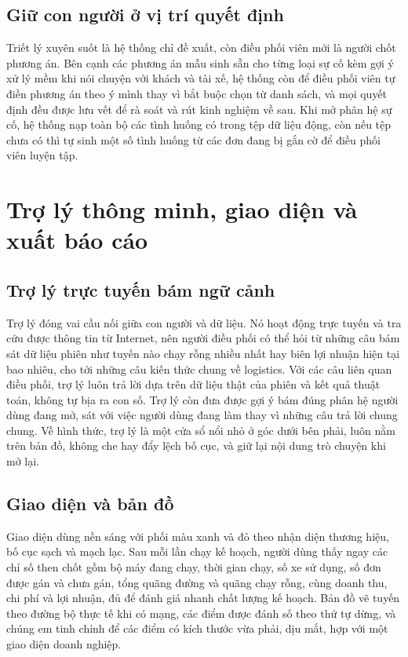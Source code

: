 \documentclass[12pt,a4paper,oneside]{report}
\begin{document}
\section{Giữ con người ở vị trí quyết định}
Triết lý xuyên suốt là hệ thống chỉ đề xuất, còn điều phối viên mới là người chốt phương án. Bên cạnh các phương án mẫu sinh sẵn cho từng loại sự cố kèm gợi ý xử lý mềm khi nói chuyện với khách và tài xế, hệ thống còn để điều phối viên tự điền phương án theo ý mình thay vì bắt buộc chọn từ danh sách, và mọi quyết định đều được lưu vết để rà soát và rút kinh nghiệm về sau. Khi mở phân hệ sự cố, hệ thống nạp toàn bộ các tình huống có trong tệp dữ liệu động, còn nếu tệp chưa có thì tự sinh một số tình huống từ các đơn đang bị gắn cờ để điều phối viên luyện tập.

\chapter{Trợ lý thông minh, giao diện và xuất báo cáo}

\section{Trợ lý trực tuyến bám ngữ cảnh}
Trợ lý đóng vai cầu nối giữa con người và dữ liệu. Nó hoạt động trực tuyến và tra cứu được thông tin từ Internet, nên người điều phối có thể hỏi từ những câu bám sát dữ liệu phiên như tuyến nào chạy rỗng nhiều nhất hay biên lợi nhuận hiện tại bao nhiêu, cho tới những câu kiến thức chung về logistics. Với các câu liên quan điều phối, trợ lý luôn trả lời dựa trên dữ liệu thật của phiên và kết quả thuật toán, không tự bịa ra con số. Trợ lý còn đưa được gợi ý bám đúng phân hệ người dùng đang mở, sát với việc người dùng đang làm thay vì những câu trả lời chung chung. Về hình thức, trợ lý là một cửa sổ nổi nhỏ ở góc dưới bên phải, luôn nằm trên bản đồ, không che hay đẩy lệch bố cục, và giữ lại nội dung trò chuyện khi mở lại.

\section{Giao diện và bản đồ}
Giao diện dùng nền sáng với phối màu xanh và đỏ theo nhận diện thương hiệu, bố cục sạch và mạch lạc. Sau mỗi lần chạy kế hoạch, người dùng thấy ngay các chỉ số then chốt gồm bộ máy đang chạy, thời gian chạy, số xe sử dụng, số đơn được gán và chưa gán, tổng quãng đường và quãng chạy rỗng, cùng doanh thu, chi phí và lợi nhuận, đủ để đánh giá nhanh chất lượng kế hoạch. Bản đồ vẽ tuyến theo đường bộ thực tế khi có mạng, các điểm được đánh số theo thứ tự dừng, và chúng em tinh chỉnh để các điểm có kích thước vừa phải, dịu mắt, hợp với một giao diện doanh nghiệp.
\end{document}
